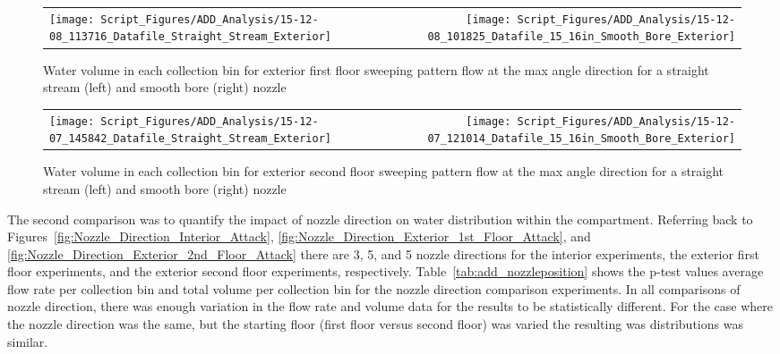 \documentclass{article}
\begin{document}
\begin{figure}[ht]
\begin{tabular*}{\textwidth}{lr}
\texttt{[image: Script\_Figures/ADD\_Analysis/15-12-08\_113716\_Datafile\_Straight\_Stream\_Exterior]} &
\texttt{[image: Script\_Figures/ADD\_Analysis/15-12-08\_101825\_Datafile\_15\_16in\_Smooth\_Bore\_Exterior]}
\end{tabular*}
\caption{Water volume in each collection bin for exterior first floor sweeping pattern flow at the max angle direction for a straight stream (left) and smooth bore (right) nozzle}
\label{fig:Exterior_FirstFloor_O_Varying_Nozzle}
\end{figure}


\begin{figure}[ht]
\begin{tabular*}{\textwidth}{lr}
\texttt{[image: Script\_Figures/ADD\_Analysis/15-12-07\_145842\_Datafile\_Straight\_Stream\_Exterior]} &
\texttt{[image: Script\_Figures/ADD\_Analysis/15-12-07\_121014\_Datafile\_15\_16in\_Smooth\_Bore\_Exterior]}
\end{tabular*}
\caption{Water volume in each collection bin for exterior second floor sweeping pattern flow at the max angle direction for a straight stream (left) and smooth bore (right) nozzle}
\label{fig:Exterior_SecondFloor_O_Varying_Nozzle}
\end{figure}


\clearpage


The second comparison was to quantify the impact of nozzle direction on water distribution within the compartment. Referring back to Figures~\ref{fig:Nozzle_Direction_Interior_Attack}, \ref{fig:Nozzle_Direction_Exterior_1st_Floor_Attack}, and \ref{fig:Nozzle_Direction_Exterior_2nd_Floor_Attack} there are 3, 5, and 5 nozzle directions for the interior experiments, the exterior first floor experiments, and the exterior second floor experiments, respectively. Table~\ref{tab:add_nozzleposition} shows the p-test values average flow rate per collection bin and total volume per collection bin for the nozzle direction comparison experiments. In all comparisons of nozzle direction, there was enough variation in the flow rate and volume data for the results to be statistically different. For the case where the nozzle direction was the same, but the starting floor (first floor versus second floor) was varied the resulting was distributions was similar.
\end{document}
